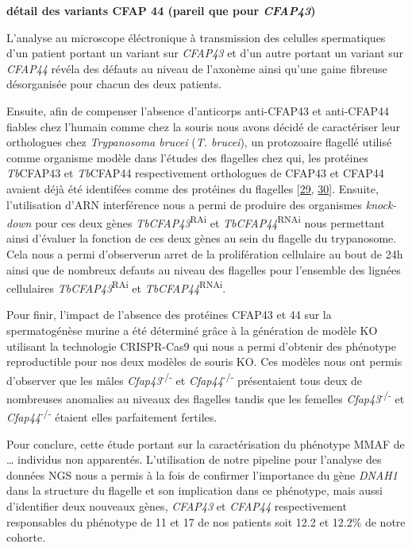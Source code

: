 \documentclass[12pt,twoside]{reedthesis}
\theoremstyle{definition}
\theoremstyle{definition}
\theoremstyle{remark}
\begin{document}
  \textbf{détail des variants CFAP 44 (pareil que pour \emph{CFAP43})}
  
  L'analyse au microscope éléctronique à transmission des celulles
  spermatiques d'un patient portant un variant sur \emph{CFAP43} et d'un
  autre portant un variant sur \emph{CFAP44} révéla des défauts au niveau
  de l'axonème ainsi qu'une gaine fibreuse désorganisée pour chacun des
  deux patients.
  
  Ensuite, afin de compenser l'absence d'anticorps anti-CFAP43 et
  anti-CFAP44 fiables chez l'humain comme chez la souris nous avons décidé
  de caractériser leur orthologues chez \emph{Trypanosoma brucei}
  (\emph{T. brucei}), un protozoaire flagellé utilisé comme organisme
  modèle dans l'études des flagelles chez qui, les protéines
  \emph{Tb}CFAP43 et \emph{Tb}CFAP44 respectivement orthologues de CFAP43
  et CFAP44 avaient déjà été identifées comme des protéines du flagelles
  {[}\protect\hyperlink{ref-Broadhead2006}{29},
  \protect\hyperlink{ref-Subota2014}{30}{]}. Ensuite, l'utilisation d'ARN
  interférence nous a permi de produire des organismes \emph{knock-down}
  pour ces deux gènes \emph{TbCFAP43}\textsuperscript{RAi} et
  \emph{TbCFAP44}\textsuperscript{RNAi} nous permettant ainsi d'évaluer la
  fonction de ces deux gènes au sein du flagelle du trypanosome. Cela nous
  a permi d'observerun arret de la prolifération cellulaire au bout de 24h
  ainsi que de nombreux defauts au niveau des flagelles pour l'ensemble
  des lignées cellulaires \emph{TbCFAP43}\textsuperscript{RAi} et
  \emph{TbCFAP44}\textsuperscript{RNAi}.
  
  Pour finir, l'impact de l'absence des protéines CFAP43 et 44 sur la
  spermatogénèse murine a été déterminé grâce à la génération de modèle KO
  utilisant la technologie CRISPR-Cas9 qui nous a permi d'obtenir des
  phénotype reproductible pour nos deux modèles de souris KO. Ces modèles
  nous ont permis d'observer que les mâles
  \emph{Cfap43}\textsuperscript{-/-} et \emph{Cfap44}\textsuperscript{-/-}
  présentaient tous deux de nombreuses anomalies au niveaux des flagelles
  tandis que les femelles \emph{Cfap43}\textsuperscript{-/-} et
  \emph{Cfap44}\textsuperscript{-/-} étaient elles parfaitement fertiles.
  
  Pour conclure, cette étude portant sur la caractérisation du phénotype
  MMAF de \ldots{} individus non apparentés. L'utilisation de notre
  pipeline pour l'analyse des données NGS nous a permis à la fois de
  confirmer l'importance du gène \emph{DNAH1} dans la structure du
  flagelle et son implication dans ce phénotype, mais aussi d'identifier
  deux nouveaux gènes, \emph{CFAP43} et \emph{CFAP44} respectivement
  responsables du phénotype de 11 et 17 de nos patients soit 12.2 et
  12.2\% de notre cohorte.
  
\end{document}
